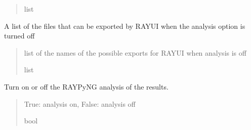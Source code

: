 \documentclass[letterpaper,10pt,english]{sphinxmanual}
\begin{document}
\begin{fulllineitems}
\begin{fulllineitems}
\begin{quote}
\begin{description}
\sphinxAtStartPar
list

\end{description}\end{quote}

\end{fulllineitems}


\begin{fulllineitems}
\label{\detokenize{code_documentation:raypyng.simulate.Simulate.possible_exports_without_analysis}}
\pysigstartsignatures
{}
\pysigstopsignatures
\sphinxAtStartPar
A list of the files that can be exported by RAY\sphinxhyphen{}UI when the
analysis option is turned off
\begin{quote}\begin{description}
\sphinxAtStartPar
list of the names of the possible exports for RAY\sphinxhyphen{}UI when analysis is off

\sphinxAtStartPar
list

\end{description}\end{quote}

\end{fulllineitems}


\begin{fulllineitems}
\label{\detokenize{code_documentation:raypyng.simulate.Simulate.raypyng_analysis}}
\pysigstartsignatures
{}
\pysigstopsignatures
\sphinxAtStartPar
Turn on or off the RAYPyNG analysis of the results.
\begin{quote}\begin{description}
\sphinxAtStartPar
True: analysis on, False: analysis off

\sphinxAtStartPar
bool

\end{description}\end{quote}


\end{fulllineitems}
\end{fulllineitems}
\end{document}
